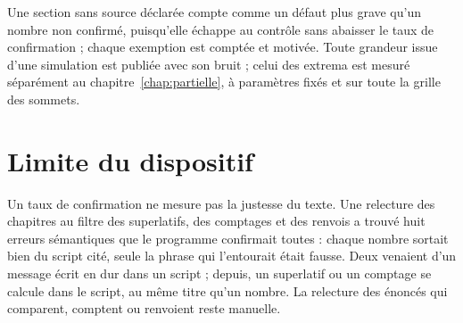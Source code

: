 Une section sans source déclarée compte
comme un défaut plus grave qu'un nombre non confirmé, puisqu'elle échappe au contrôle sans abaisser
le taux de confirmation ; chaque exemption est comptée et motivée. Toute grandeur issue d'une
simulation est publiée avec son bruit ; celui des extrema est mesuré séparément au
chapitre~\ref{chap:partielle}, à paramètres fixés et sur toute la grille des sommets.

\section{Limite du dispositif}

Un taux de confirmation ne mesure pas la justesse du texte. Une relecture des chapitres au filtre
des superlatifs, des comptages et des renvois a trouvé huit erreurs sémantiques que le programme
confirmait toutes : chaque nombre sortait bien du script cité, seule la phrase qui l'entourait
était fausse. Deux venaient d'un message écrit en dur dans un script ; depuis, un superlatif ou un
comptage se calcule dans le script, au même titre qu'un nombre. La relecture des énoncés qui
comparent, comptent ou renvoient reste manuelle.

